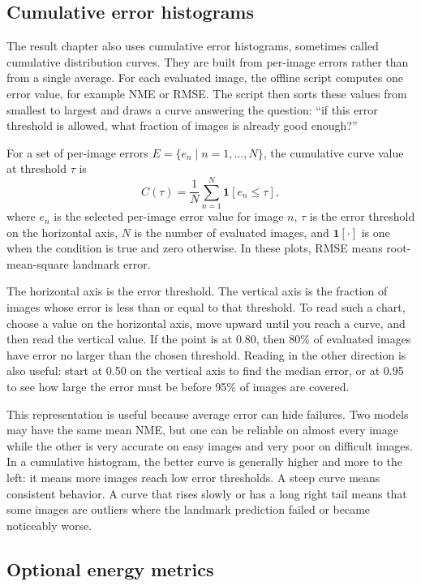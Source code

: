 \subsection{Cumulative error histograms}

The result chapter also uses cumulative error histograms, sometimes called
cumulative distribution curves. They are built from per-image errors rather than
from a single average. For each evaluated image, the offline script computes one
error value, for example NME or RMSE. The script then sorts these values from
smallest to largest and draws a curve answering the question: ``if this error
threshold is allowed, what fraction of images is already good enough?''

For a set of per-image errors \(E=\{e_n\mid n=1,\dots,N\}\), the cumulative
curve value at threshold \(\tau\) is
\begin{equation}
C(\tau) = \frac{1}{N}\sum_{n=1}^{N}\mathbf{1}[e_n \le \tau],
\end{equation}
where \(e_n\) is the selected per-image error value for image \(n\), \(\tau\) is
the error threshold on the horizontal axis, \(N\) is the number of evaluated
images, and \(\mathbf{1}[\cdot]\) is one when the condition is true and zero
otherwise.
In these plots, RMSE means root-mean-square landmark error.

The horizontal axis is the error threshold. The vertical axis is the fraction of
images whose error is less than or equal to that threshold. To read such a chart,
choose a value on the horizontal axis, move upward until you reach a curve, and
then read the vertical value. If the point is at \(0.80\), then 80\% of evaluated
images have error no larger than the chosen threshold. Reading in the other
direction is also useful: start at 0.50 on the vertical axis to find the median
error, or at 0.95 to see how large the error must be before 95\% of images are
covered.

This representation is useful because average error can hide failures. Two
models may have the same mean NME, but one can be reliable on almost every image
while the other is very accurate on easy images and very poor on difficult
images. In a cumulative histogram, the better curve is generally higher and more
to the left: it means more images reach low error thresholds. A steep curve
means consistent behavior. A curve that rises slowly or has a long right tail
means that some images are outliers where the landmark prediction failed or
became noticeably worse.

\subsection{Optional energy metrics}

